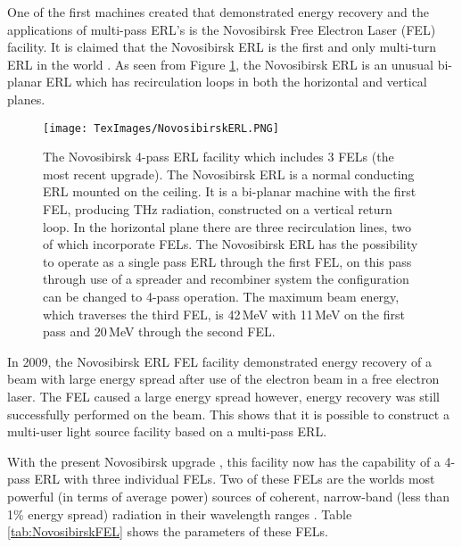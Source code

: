 \documentclass[11pt]{article}
\begin{document}
\vspace{5mm}

One of the first machines created that demonstrated energy recovery and the applications of multi-pass ERL's is the Novosibirsk Free Electron Laser (FEL) facility. It is claimed that the Novosibirsk ERL is the first and only multi-turn ERL in the world \cite{NovosibirskIPAC}. As seen from Figure \ref{fig:NovosibirskERL}, the Novosibirsk ERL is an unusual bi-planar ERL which has recirculation loops in both the horizontal and vertical planes.

\begin{figure}[H]
\centering
\texttt{[image: TexImages/NovosibirskERL.PNG]}
\caption{\label{fig:NovosibirskERL} The Novosibirsk 4-pass ERL \cite{NovosibirskIPAC} facility which includes 3 FELs (the most recent upgrade). The Novosibirsk ERL is a normal conducting ERL mounted on the ceiling. It is a bi-planar machine with the first FEL, producing THz radiation, constructed on a vertical return loop. In the horizontal plane there are three recirculation lines, two of which incorporate FELs. The Novosibirsk ERL has the possibility to operate as a single pass ERL through the first FEL, on this pass through use of a spreader and recombiner system the configuration can be changed to 4-pass operation. The maximum beam energy, which traverses the third FEL, is 42\,MeV with 11\,MeV on the first pass and 20\,MeV through the second FEL.}
\end{figure}

In 2009, the Novosibirsk ERL FEL facility demonstrated energy recovery of a beam with large energy spread \cite{NovosibirskFEL} after use of the electron beam in a free electron laser. The FEL caused a large energy spread however, energy recovery was still successfully performed on the beam.  This shows that it is possible to construct a multi-user light source facility based on a multi-pass ERL.

With the present Novosibirsk upgrade \cite{NovosibirskIPAC}, this facility now has the capability of a 4-pass ERL with three individual FELs. Two of these FELs are the worlds most powerful (in terms of average power) sources of coherent, narrow-band (less than 1\% energy spread) radiation in their wavelength ranges \cite{NovosibirskIPAC}. Table \ref{tab:NovosibirskFEL} shows the parameters of these FELs.
\end{document}
